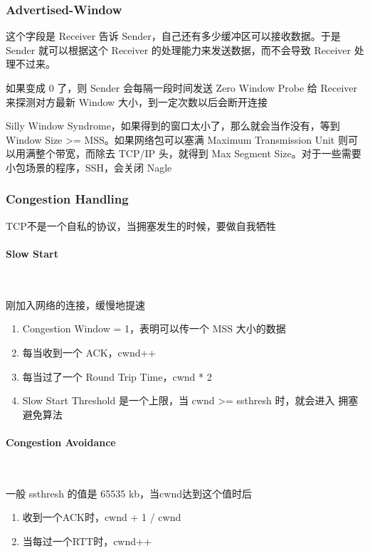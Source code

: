 \documentclass[11pt,journal,compsoc]{IEEEtran}
\begin{document}
\subsubsection{Advertised-Window}

这个字段是 Receiver 告诉 Sender，自己还有多少缓冲区可以接收数据。于是 Sender 就可以根据这个 Receiver 的处理能力来发送数据，而不会导致 Receiver 处理不过来。

如果变成 0 了，则 Sender 会每隔一段时间发送 Zero Window Probe 给 Receiver 来探测对方最新 Window 大小，到一定次数以后会断开连接

Silly Window Syndrome，如果得到的窗口太小了，那么就会当作没有，等到 Window Size >= MSS。如果网络包可以塞满 Maximum Transmission Unit 则可以用满整个带宽，而除去 TCP/IP 头，就得到 Max Segment Size。对于一些需要小包场景的程序，SSH，会关闭 Nagle


\subsubsection{Congestion Handling}

TCP不是一个自私的协议，当拥塞发生的时候，要做自我牺牲

\paragraph{Slow Start} ~

刚加入网络的连接，缓慢地提速

\begin{enumerate}
    \item Congestion Window = 1，表明可以传一个 MSS 大小的数据

    \item 每当收到一个 ACK，cwnd++

    \item 每当过了一个 Round Trip Time，cwnd * 2

    \item Slow Start Threshold 是一个上限，当 cwnd >= ssthresh 时，就会进入 拥塞避免算法
\end{enumerate}

\paragraph{Congestion Avoidance} ~

一般 ssthresh 的值是 65535 kb，当cwnd达到这个值时后

\begin{enumerate}
    \item 收到一个ACK时，cwnd + 1 / cwnd

    \item 当每过一个RTT时，cwnd++
\end{enumerate}
\end{document}
